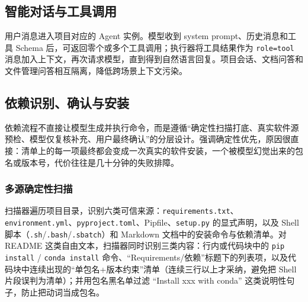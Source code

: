 \documentclass[UTF8,11pt,a4paper]{ctexart}
\newcommand{\code}[1]{\texttt{\small #1}}
\begin{document}
\subsection{智能对话与工具调用}
用户消息进入项目对应的 Agent 实例。模型收到 system prompt、历史消息和工具 Schema 后，可返回零个或多个工具调用；执行器将工具结果作为 \code{role=tool} 消息加入上下文，再次请求模型，直到得到自然语言回复。项目会话、文档问答和文件管理问答相互隔离，降低跨场景上下文污染。

\begin{center}
\end{center}

\subsection{依赖识别、确认与安装}
依赖流程不直接让模型生成并执行命令，而是遵循“确定性扫描打底、真实软件源预检、模型仅复核补充、用户最终确认”的分层设计。强调确定性优先，原因很直接：清单上的每一项最终都会变成一次真实的软件安装，一个被模型幻觉出来的包名或版本号，代价往往是几十分钟的失败排障。

\subsubsection{多源确定性扫描}
扫描器遍历项目目录，识别六类可信来源：\code{requirements.txt}、\code{environment.yml}、\code{pyproject.toml}、Pipfile、\code{setup.py} 的显式声明，以及 Shell 脚本（\code{.sh}/\code{.bash}/\code{.sbatch}）和 Markdown 文档中的安装命令与依赖清单。对 README 这类自由文本，扫描器同时识别三类内容：行内或代码块中的 \code{pip install} / \code{conda install} 命令、“Requirements/依赖”标题下的列表项，以及代码块中连续出现的“单包名+版本约束”清单（连续三行以上才采纳，避免把 Shell 片段误判为清单）；并用包名黑名单过滤 “Install xxx with conda” 这类说明性句子，防止把动词当成包名。
\end{document}
